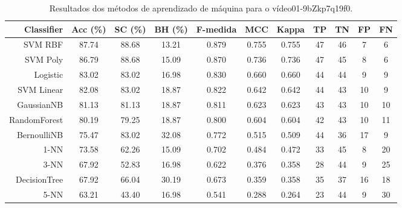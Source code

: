 \begin{table}[!htb]
\centering
\caption{Resultados dos métodos de aprendizado de máquina para o vídeo01-9bZkp7q19f0.}
\label{tab:01-9bZkp7q19f0}
\begin{tabular}{r|c|c|c|c|c|c|c|c|c|c}
\hline\hline
Classifier & Acc (\%) & SC (\%) & BH (\%) & F-medida & MCC & Kappa & TP & TN & FP & FN \\ \hline
SVM RBF & 87.74 & 88.68 & 13.21 & 0.879 & 0.755 & 0.755 & 47 & 46 & 7 & 6 \\ 
SVM Poly & 86.79 & 88.68 & 15.09 & 0.870 & 0.736 & 0.736 & 47 & 45 & 8 & 6 \\ 
Logistic & 83.02 & 83.02 & 16.98 & 0.830 & 0.660 & 0.660 & 44 & 44 & 9 & 9 \\ 
SVM Linear & 82.08 & 83.02 & 18.87 & 0.822 & 0.642 & 0.642 & 44 & 43 & 10 & 9 \\ 
GaussianNB & 81.13 & 81.13 & 18.87 & 0.811 & 0.623 & 0.623 & 43 & 43 & 10 & 10 \\ 
RandomForest & 80.19 & 79.25 & 18.87 & 0.800 & 0.604 & 0.604 & 42 & 43 & 10 & 11 \\ 
BernoulliNB & 75.47 & 83.02 & 32.08 & 0.772 & 0.515 & 0.509 & 44 & 36 & 17 & 9 \\ 
1-NN & 73.58 & 62.26 & 15.09 & 0.702 & 0.484 & 0.472 & 33 & 45 & 8 & 20 \\ 
3-NN & 67.92 & 52.83 & 16.98 & 0.622 & 0.376 & 0.358 & 28 & 44 & 9 & 25 \\ 
DecisionTree & 67.92 & 66.04 & 30.19 & 0.673 & 0.359 & 0.358 & 35 & 37 & 16 & 18 \\ 
5-NN & 63.21 & 43.40 & 16.98 & 0.541 & 0.288 & 0.264 & 23 & 44 & 9 & 30 \\ 
\hline\hline
\end{tabular}
\end{table}
